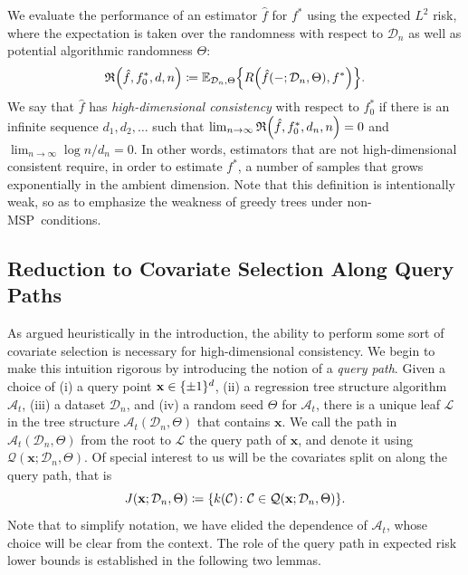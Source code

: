 \documentclass[11pt]{article}
\newcommand{\bx}{\mathbf{x}}
\DeclarePairedDelimiter{\braces}{\lbrace}{\rbrace}
\DeclarePairedDelimiter{\paren}{(}{)}
\newcommand{\E}{\mathbb{E}}
\newcommand{\tree}{\mathfrak{T}}
\newcommand{\cell}{\mathcal{C}}
\newcommand{\leaf}{\mathcal{L}}
\newcommand{\binspace}{\braces{\pm 1}^\nfeats}
\newcommand{\nfeats}{d}
\newcommand{\nsamples}{n}
\newcommand{\data}[1][n]{\mathcal{D}_{#1}}
\newcommand{\MSP}{\textsf{MSP}}
\newcommand{\fna}{\hat{f}_{\operatorname{NA}}}
\newcommand{\alg}{\mathcal{A}}
\newcommand{\objective}{\mathfrak{R}}
\newcommand{\querypath}{\mathcal{Q}}
\begin{document}
We evaluate the performance of an estimator $\hat f$ for $f^*$ using the expected $L^2$ risk, where the expectation is taken over the randomness with respect to $\data$ as well as potential algorithmic randomness $\Theta$:
\begin{equation}
    \objective\paren*{\hat f, f^*_0,\nfeats,\nsamples} \coloneqq \E_{\data,\Theta}\braces*{R\paren*{\hat f(-;\data,\Theta),f^*}}.
\end{equation}
We say that $\hat f$ has \emph{high-dimensional consistency} with respect to $f_0^*$ if there is an infinite sequence $\nfeats_1,\nfeats_2,\ldots$ such that $\lim_{\nsamples \to \infty} \objective\paren*{\hat f, f^*_0,\nfeats_{\nsamples},\nsamples} = 0$ and $\lim_{\nsamples \to \infty}\log \nsamples / \nfeats_\nsamples = 0$.
In other words, estimators that are not high-dimensional consistent require, in order to estimate $f^*$, a number of samples that grows exponentially in the ambient dimension.
Note that this definition is intentionally weak, so as to emphasize the weakness of greedy trees under non-\MSP~conditions.



\subsection{Reduction to Covariate Selection Along Query Paths}
\label{subsec:covariate_selection}

As argued heuristically in the introduction, the ability to perform some sort of covariate selection is necessary for high-dimensional consistency.
We begin to make this intuition rigorous by introducing the notion of a \emph{query path}. 
Given a choice of (i) a query point $\bx \in \binspace$, (ii) a regression tree structure algorithm $\alg_t$, (iii) a dataset $\data$, and (iv) a random seed $\Theta$ for $\alg_t$, there is a unique leaf $\leaf$ in the tree structure $\alg_t(\data,\Theta)$ that contains $\bx$.
We call the path in $\alg_t(\data,\Theta)$ from the root to $\leaf$ the query path of $\bx$, and denote it using $\querypath(\bx;\data,\Theta)$.
Of special interest to us will be the covariates split on along the query path, that is
\begin{equation}
    J(\bx;\data,\Theta) \coloneqq \braces*{ k(\cell) \colon \cell \in \querypath(\bx;\data,\Theta)}.
\end{equation}
Note that to simplify notation, we have elided the dependence of $\alg_t$, whose choice will be clear from the context.
The role of the query path in expected risk lower bounds is established in the following two lemmas.
\end{document}
